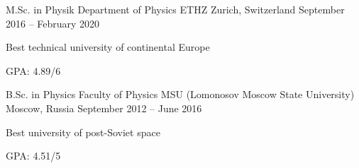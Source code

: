 \begin{cventries}
\cventry
	{M.Sc. in Physik}
	{Department of Physics ETHZ}
	{Zurich, Switzerland}
	{September 2016 -- February 2020}
	{
		\begin{cvitems}
			\item {Best technical university of continental Europe}
			\item {GPA: 4.89/6}
		\end{cvitems}
	}
	
\cventry
	{B.Sc. in Physics}
	{Faculty of Physics MSU (Lomonosov Moscow State University)}
	{Moscow, Russia}
	{September 2012 -- June 2016}
	{
		\begin{cvitems}
			\item {Best university of post-Soviet space}
			\item {GPA: 4.51/5}
		\end{cvitems}
	}
	
\end{cventries}
